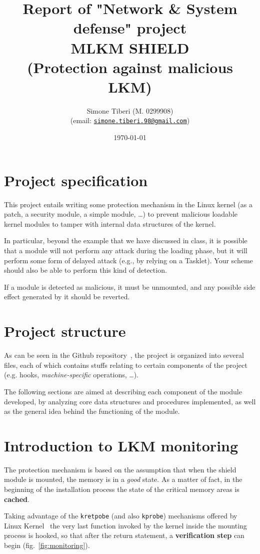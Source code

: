 \documentclass{article}
\title{\small Report of "Network \& System defense" project \\
\Huge \textbf{MLKM SHIELD}\\
\Large (Protection against malicious LKM)}
\author{Simone Tiberi (M. 0299908)\\%
(email: \texttt{\href{mailto:simone.tiberi.98@gmail.com}{simone.tiberi.98@gmail.com}})}
\date{\today}
\begin{document}
\maketitle
	\section{Project specification}
	This project entails writing some protection mechanism in the Linux kernel (as a patch, a security
	module, a simple module, \dots) to prevent malicious loadable kernel modules to tamper with
	internal data structures of the kernel.

	In particular, beyond the example that we have discussed in class, it is possible that a module will
	not perform any attack during the loading phase, but it will perform some form of delayed attack
	(e.g., by relying on a Tasklet). Your scheme should also be able to perform this kind of detection.

	If a module is detected as malicious, it must be unmounted, and any possible side effect
	generated by it should be reverted.

	\section{Project structure}
	As can be seen in the Github repository~\cite{github:repo}, the project is organized into several
	files, each of which contains stuffs relating to certain components of the project (e.g. hooks,
	\textit{machine-specific} operations, \dots).

	The following sections are aimed at describing each component of the module developed, by analyzing
	core data structures and procedures implemented, as well as the general idea behind the
	functioning of the module.

	\section{Introduction to LKM monitoring}
	The protection mechanism is based on the assumption that when the shield module is mounted, the memory is
	in a \textit{good} state. As a matter of fact, in the beginning of the installation process the state of
	the critical memory areas is \textbf{cached}.

	Taking advantage of the \texttt{kretpobe} (and also \texttt{kprobe}) mechanisms offered by Linux
	Kernel~\cite{doc:kprobe} the very last function invoked by the kernel inside the mounting process
	is hooked, so that after the return statement, a \textbf{verification step} can begin
	(fig.~\ref{fig:monitoring}).
\end{document}
